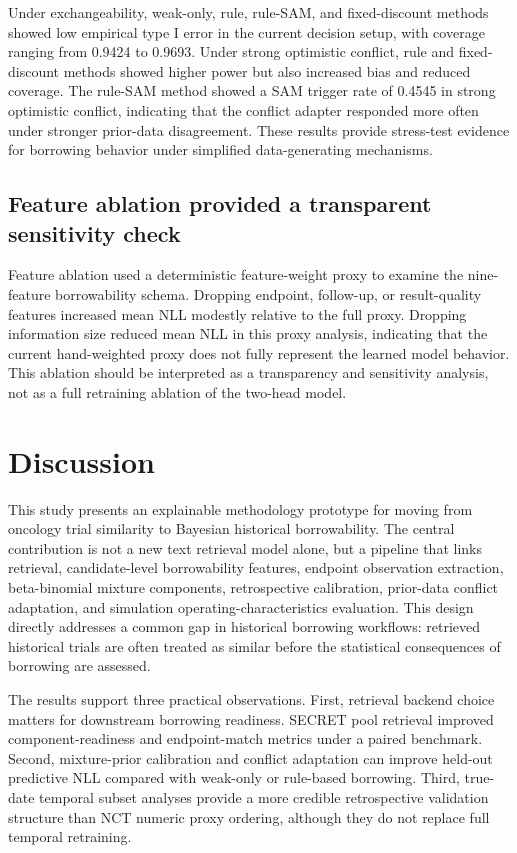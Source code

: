 \documentclass[11pt]{article}
\begin{document}
Under exchangeability, weak-only, rule, rule-SAM, and fixed-discount methods showed low empirical type I error in the current decision setup, with coverage ranging from 0.9424 to 0.9693. Under strong optimistic conflict, rule and fixed-discount methods showed higher power but also increased bias and reduced coverage. The rule-SAM method showed a SAM trigger rate of 0.4545 in strong optimistic conflict, indicating that the conflict adapter responded more often under stronger prior-data disagreement. These results provide stress-test evidence for borrowing behavior under simplified data-generating mechanisms.

\subsection{Feature ablation provided a transparent sensitivity check}

Feature ablation used a deterministic feature-weight proxy to examine the nine-feature borrowability schema. Dropping endpoint, follow-up, or result-quality features increased mean NLL modestly relative to the full proxy. Dropping information size reduced mean NLL in this proxy analysis, indicating that the current hand-weighted proxy does not fully represent the learned model behavior. This ablation should be interpreted as a transparency and sensitivity analysis, not as a full retraining ablation of the two-head model.

\section{Discussion}

This study presents an explainable methodology prototype for moving from oncology trial similarity to Bayesian historical borrowability. The central contribution is not a new text retrieval model alone, but a pipeline that links retrieval, candidate-level borrowability features, endpoint observation extraction, beta-binomial mixture components, retrospective calibration, prior-data conflict adaptation, and simulation operating-characteristics evaluation. This design directly addresses a common gap in historical borrowing workflows: retrieved historical trials are often treated as similar before the statistical consequences of borrowing are assessed.

The results support three practical observations. First, retrieval backend choice matters for downstream borrowing readiness. SECRET pool retrieval improved component-readiness and endpoint-match metrics under a paired benchmark. Second, mixture-prior calibration and conflict adaptation can improve held-out predictive NLL compared with weak-only or rule-based borrowing. Third, true-date temporal subset analyses provide a more credible retrospective validation structure than NCT numeric proxy ordering, although they do not replace full temporal retraining.
\end{document}
